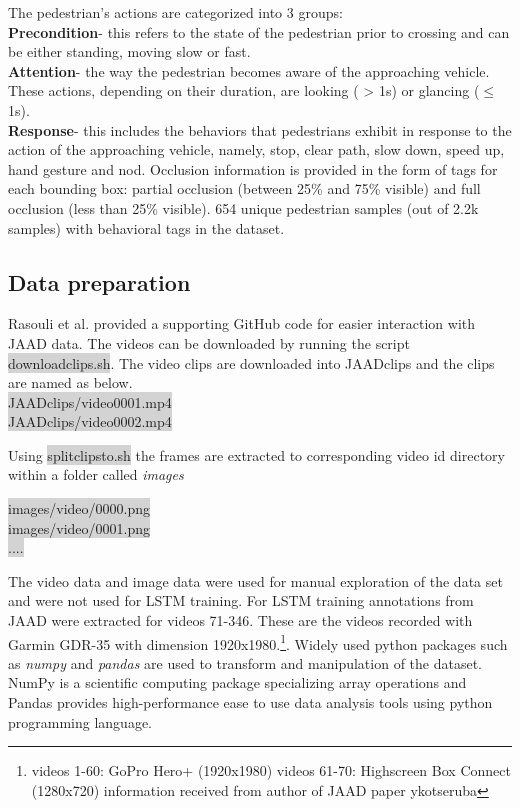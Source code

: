 The pedestrian's actions are categorized into 3 groups: \\
\textbf{Precondition}- this refers to the state of the pedestrian prior to crossing and can be either standing, moving slow or fast. \\
\textbf{Attention}- the way the pedestrian becomes aware of the approaching vehicle. These actions, depending on their duration, are looking ( > 1s) or glancing ($\leq$ 1s). \\
\textbf{Response}- this includes the behaviors that pedestrians exhibit in response
to the action of the approaching vehicle, namely, stop, clear path, slow down, speed up, hand gesture and nod.
Occlusion information is provided in the form of tags for each bounding box: partial occlusion (between 25\% and 75\% visible) and full occlusion (less than 25\% visible).  654 unique pedestrian samples (out of 2.2k samples) with behavioral tags in the dataset. 

\subsection{Data preparation}
\cite{rasouli2017agreeing} Rasouli et al. provided a supporting GitHub code for easier interaction with JAAD data. The videos can be downloaded by running the script \colorbox{lightgray}{download\textunderscore clips.sh}. The video clips are downloaded into JAAD\textunderscore clips and the clips are named as below.\\
\colorbox{lightgray} {JAAD\textunderscore clips/video\textunderscore  0001.mp4} \\
\colorbox{lightgray} {JAAD\textunderscore clips/video\textunderscore  0002.mp4}

Using \colorbox{lightgray}{split\textunderscore clips\textunderscore to\textunderscore .sh} the frames are extracted to corresponding video id directory within a folder called \textit{images} \\
\begin{center}
\colorbox{lightgray} {images/video/0000.png} \\
\colorbox{lightgray} {images/video/0001.png} \\
\colorbox{lightgray} {....}
\end{center}

The video data and image data were used for manual exploration of the data set and were not used for LSTM training. For LSTM training annotations from JAAD were extracted for videos 71-346. These are the videos recorded with Garmin GDR-35 with dimension 1920x1980.\footnote{videos 1-60: GoPro Hero+ (1920x1980)
videos 61-70: Highscreen Box Connect (1280x720) information received from author of JAAD paper ykotseruba}. Widely used python packages such as \textit{numpy }and \textit{pandas} are used to transform and manipulation of the dataset. NumPy is a scientific computing package specializing array operations and Pandas provides high-performance ease to use data analysis tools using python programming language.  \\

